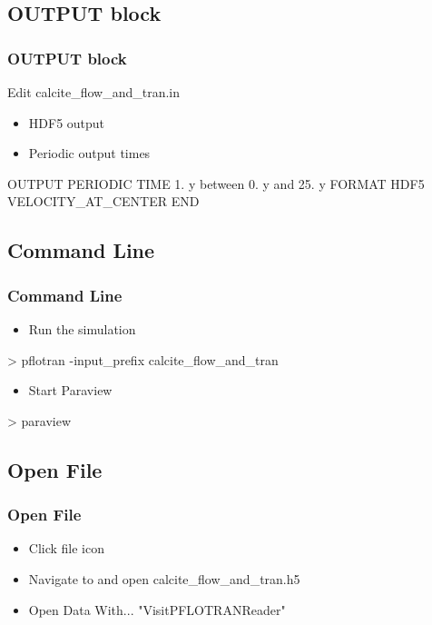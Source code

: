 \documentclass{beamer}
\newcommand\magentacomment[1]{{{\color{magenta} #1}}}
\begin{document}

\subsection{OUTPUT block}

\begin{frame}[fragile]\frametitle{OUTPUT block}
Edit calcite\_flow\_and\_tran.in
\begin{itemize}
\item HDF5 output
\item Periodic output times
\end{itemize}
\begin{semiverbatim}
OUTPUT
  \magentacomment{PERIODIC TIME 1. y between 0. y and 25. y}
  FORMAT \magentacomment{HDF5}
  VELOCITY_AT_CENTER
END
\end{semiverbatim}

\end{frame}

\subsection{Command Line}

\begin{frame}[fragile]\frametitle{Command Line}
\begin{itemize}
  \item{Run the simulation}
\end{itemize}
\begin{semiverbatim}
> pflotran -input_prefix calcite_flow_and_tran
\end{semiverbatim}
\begin{itemize}
  \item{Start Paraview}
\end{itemize}
\begin{semiverbatim}
> paraview
\end{semiverbatim}
\end{frame}

\subsection{Open File}

\begin{frame}[fragile]\frametitle{Open File}

\begin{itemize}
  \item Click file icon
  \item Navigate to and open calcite\_flow\_and\_tran.h5 
  \item Open Data With... "VisitPFLOTRANReader"
\end{itemize}

\end{frame}
\end{document}
